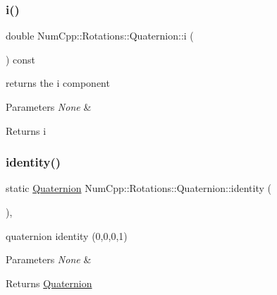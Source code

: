 \subsubsection{\texorpdfstring{i()}{i()}}
{\footnotesize\ttfamily double Num\+Cpp\+::\+Rotations\+::\+Quaternion\+::i (\begin{DoxyParamCaption}{ }\end{DoxyParamCaption}) const\hspace{0.3cm}{\ttfamily [inline]}}

returns the i component


\begin{DoxyParams}{Parameters}
{\em None} & \\
\hline
\end{DoxyParams}
\begin{DoxyReturn}{Returns}
i 
\end{DoxyReturn}
\mbox{\label{class_num_cpp_1_1_rotations_1_1_quaternion_a55f3aeaaf13db905717f1c3de476a921}} 
\subsubsection{\texorpdfstring{identity()}{identity()}}
{\footnotesize\ttfamily static \mbox{\hyperlink{class_num_cpp_1_1_rotations_1_1_quaternion}{Quaternion}} Num\+Cpp\+::\+Rotations\+::\+Quaternion\+::identity (\begin{DoxyParamCaption}{ }\end{DoxyParamCaption})\hspace{0.3cm}{\ttfamily [inline]}, {\ttfamily [static]}}

quaternion identity (0,0,0,1)


\begin{DoxyParams}{Parameters}
{\em None} & \\
\hline
\end{DoxyParams}
\begin{DoxyReturn}{Returns}
\mbox{\hyperlink{class_num_cpp_1_1_rotations_1_1_quaternion}{Quaternion}} 
\end{DoxyReturn}
\mbox{\label{class_num_cpp_1_1_rotations_1_1_quaternion_acf37c9e15c6a142a7ec3ff4756103347}} 
